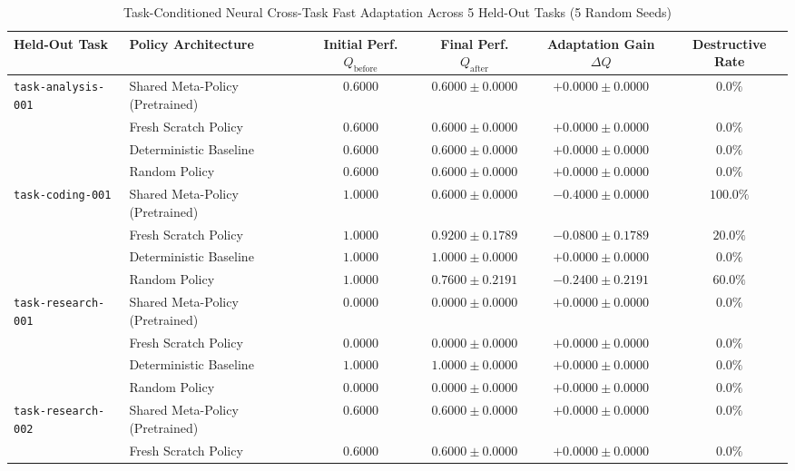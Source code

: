 \begin{table}[!t]
\centering
\caption{Task-Conditioned Neural Cross-Task Fast Adaptation Across 5 Held-Out Tasks (5 Random Seeds)}
\label{tab:neural_adaptation}
\footnotesize
\begin{tabular}{llcccc}
\toprule
\textbf{Held-Out Task} & \textbf{Policy Architecture} & \textbf{Initial Perf. $Q_{\mathrm{before}}$} & \textbf{Final Perf. $Q_{\mathrm{after}}$} & \textbf{Adaptation Gain $\Delta Q$} & \textbf{Destructive Rate} \\
\midrule
\multirow{4}{*}{\texttt{task-analysis-001}} 
& Shared Meta-Policy (Pretrained) & $0.6000$ & $0.6000 \pm 0.0000$ & $+0.0000 \pm 0.0000$ & $0.0\%$ \\
& Fresh Scratch Policy & $0.6000$ & $0.6000 \pm 0.0000$ & $+0.0000 \pm 0.0000$ & $0.0\%$ \\
& Deterministic Baseline & $0.6000$ & $0.6000 \pm 0.0000$ & $+0.0000 \pm 0.0000$ & $0.0\%$ \\
& Random Policy & $0.6000$ & $0.6000 \pm 0.0000$ & $+0.0000 \pm 0.0000$ & $0.0\%$ \\
\midrule
\multirow{4}{*}{\texttt{task-coding-001}} 
& Shared Meta-Policy (Pretrained) & $1.0000$ & $0.6000 \pm 0.0000$ & $-0.4000 \pm 0.0000$ & $100.0\%$ \\
& Fresh Scratch Policy & $1.0000$ & $0.9200 \pm 0.1789$ & $-0.0800 \pm 0.1789$ & $20.0\%$ \\
& Deterministic Baseline & $1.0000$ & $1.0000 \pm 0.0000$ & $+0.0000 \pm 0.0000$ & $0.0\%$ \\
& Random Policy & $1.0000$ & $0.7600 \pm 0.2191$ & $-0.2400 \pm 0.2191$ & $60.0\%$ \\
\midrule
\multirow{4}{*}{\texttt{task-research-001}} 
& Shared Meta-Policy (Pretrained) & $0.0000$ & $0.0000 \pm 0.0000$ & $+0.0000 \pm 0.0000$ & $0.0\%$ \\
& Fresh Scratch Policy & $0.0000$ & $0.0000 \pm 0.0000$ & $+0.0000 \pm 0.0000$ & $0.0\%$ \\
& Deterministic Baseline & $1.0000$ & $1.0000 \pm 0.0000$ & $+0.0000 \pm 0.0000$ & $0.0\%$ \\
& Random Policy & $0.0000$ & $0.0000 \pm 0.0000$ & $+0.0000 \pm 0.0000$ & $0.0\%$ \\
\midrule
\multirow{4}{*}{\texttt{task-research-002}} 
& Shared Meta-Policy (Pretrained) & $0.6000$ & $0.6000 \pm 0.0000$ & $+0.0000 \pm 0.0000$ & $0.0\%$ \\
& Fresh Scratch Policy & $0.6000$ & $0.6000 \pm 0.0000$ & $+0.0000 \pm 0.0000$ & $0.0\%$ \\

\end{tabular}
\end{table}
